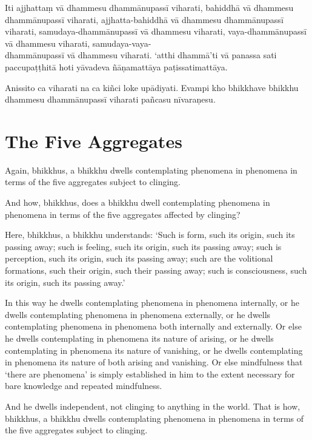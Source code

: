 Iti ajjhattaṃ vā dhammesu dhammānupassī viharati,
bahiddhā vā dhammesu dhammānupassī viharati,
ajjhatta-bahiddhā vā dhammesu dhammānupassī viharati,
samudaya-dhammānupassī vā dhammesu viharati,
vaya-dhammānupassī vā dhammesu viharati,
samudaya-vaya-\\ dhammānupassī vā dhammesu viharati.
`atthi dhammā'ti vā panassa sati paccupaṭṭhitā hoti
yāvadeva ñāṇamattāya paṭissatimattāya.

Anissito ca viharati na ca kiñci loke upādiyati. Evampi kho bhikkhave bhikkhu
dhammesu dhammānupassī viharati pañcasu nīvaraṇesu.


\englishPage
\section{The Five Aggregates}

Again, bhikkhus, a bhikkhu dwells contemplating phenomena in phenomena in terms
of the five aggregates subject to clinging.

And how, bhikkhus, does a bhikkhu dwell contemplating phenomena in phenomena in
terms of the five aggregates affected by clinging?

Here, bhikkhus, a bhikkhu understands:
`Such is form, such its origin, such its passing away;
such is feeling, such its origin, such its passing away;
such is perception, such its origin, such its passing away;
such are the volitional formations, such their origin, such their passing away;
such is consciousness, such its origin, such its passing away.'

In this way he dwells contemplating phenomena in phenomena internally, or he
dwells contemplating phenomena in phenomena externally, or he dwells
contemplating phenomena in phenomena both internally and externally. Or else he
dwells contemplating in phenomena its nature of arising, or he dwells
contemplating in phenomena its nature of vanishing, or he dwells contemplating
in phenomena its nature of both arising and vanishing. Or else mindfulness that
‘there are phenomena’ is simply established in him to the extent necessary for
bare knowledge and repeated mindfulness.

And he dwells independent, not clinging to anything in the world. That is how,
bhikkhus, a bhikkhu dwells contemplating phenomena in phenomena in terms of the
five aggregates subject to clinging.



